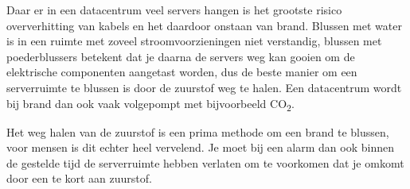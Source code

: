 Daar er in een datacentrum veel servers hangen is het grootste risico oververhitting van kabels en het daardoor onstaan van brand. Blussen met water is in een ruimte met zoveel stroomvoorzieningen niet verstandig, blussen met poederblussers betekent dat je daarna de servers weg kan gooien om de elektrische componenten aangetast worden, dus de beste manier om een serverruimte te blussen is door de zuurstof weg te halen. Een datacentrum wordt bij brand dan ook vaak volgepompt met bijvoorbeeld CO\textsubscript{2}.

Het weg halen van de zuurstof is een prima methode om een brand te blussen, voor mensen is dit echter heel vervelend. Je moet bij een alarm dan ook binnen de gestelde tijd de serverruimte hebben verlaten om te voorkomen dat je omkomt door een te kort aan zuurstof.
